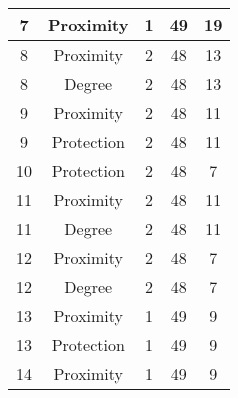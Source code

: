 \documentclass[results.tex]{subfiles}
\begin{document}
\begin{center}
\begin{tabular}{| c || c | c | c | c |}
            \hline
            7                       & Proximity                    & 1                      & 49                      & 19                   \\
            \hline
            8                       & Proximity                    & 2                      & 48                      & 13                   \\
            \hline
            8                       & Degree                       & 2                      & 48                      & 13                   \\
            \hline
            9                       & Proximity                    & 2                      & 48                      & 11                   \\
            \hline
            9                       & Protection                   & 2                      & 48                      & 11                   \\
            \hline
            10                      & Protection                   & 2                      & 48                      & 7                    \\
            \hline
            11                      & Proximity                    & 2                      & 48                      & 11                   \\
            \hline
            11                      & Degree                       & 2                      & 48                      & 11                   \\
            \hline
            12                      & Proximity                    & 2                      & 48                      & 7                    \\
            \hline
            12                      & Degree                       & 2                      & 48                      & 7                    \\
            \hline
            13                      & Proximity                    & 1                      & 49                      & 9                    \\
            \hline
            13                      & Protection                   & 1                      & 49                      & 9                    \\
            \hline
            14                      & Proximity                    & 1                      & 49                      & 9                    \\

\end{tabular}
\end{center}
\end{document}
